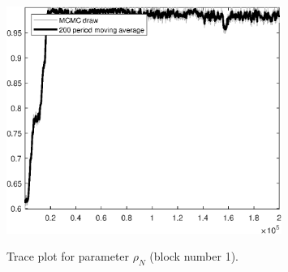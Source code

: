 \begin{figure}[H]
\centering
  \includegraphics[width=0.8\textwidth]{BRS_sectoral_rest/graphs/TracePlot_rho_N_blck_1}\\
    \caption{Trace plot for parameter ${\rho_N}$ (block number 1).}
\end{figure}
